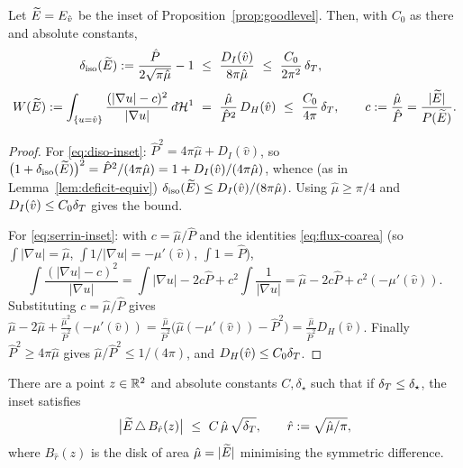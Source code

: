 \begin{proposition}\label{prop:controlled}
Let $\widetilde E=E_{\hat v}$ be the inset of Proposition~\ref{prop:goodlevel}.
Then, with $C_0$ as there and absolute constants,
\begin{align}
   \diso(\Etil):=\frac{\hat P}{2\sqrt{\pi\hat\mu}}-1
   &\ \le\ \frac{D_I(\hat v)}{8\pi\hat\mu}\ \le\ \frac{C_0}{2\pi^2}\,\dT,
   \label{eq:diso-inset}\\[1mm]
   W(\Etil):=\int_{\{u=\hat v\}}\frac{(|\nabla u|-c)^2}{|\nabla u|}\,d\HH^1
   &\ =\ \frac{\hat\mu}{\hat P^{2}}\,D_H(\hat v)\ \le\ \frac{C_0}{4\pi}\,\dT,
   \qquad c:=\frac{\hat\mu}{\hat P}=\frac{|\Etil|}{P(\Etil)}.
   \label{eq:serrin-inset}
\end{align}
\end{proposition}

\begin{proof}
For \eqref{eq:diso-inset}: $\hat P^2=4\pi\hat\mu+D_I(\hat v)$, so
$\bigl(1+\delta_{\mathrm{iso}}(\widetilde E)\bigr)^2=\hat P^2/(4\pi\hat\mu)=1+D_I(\hat
v)/(4\pi\hat\mu)$, whence (as in Lemma~\ref{lem:deficit-equiv})
$\delta_{\mathrm{iso}}(\widetilde E)\le D_I(\hat v)/(8\pi\hat\mu)$. Using
$\hat\mu\ge\pi/4$ and $D_I(\hat v)\le C_0\delta_T$ gives the bound.

For \eqref{eq:serrin-inset}: with $c=\hat\mu/\hat P$ and the identities
\eqref{eq:flux-coarea} (so $\int|\nabla u|=\hat\mu$,
$\int1/|\nabla u|=-\mu'(\hat v)$, $\int 1=\hat P$),
\[
   \int\frac{(|\nabla u|-c)^2}{|\nabla u|}
   =\int|\nabla u|-2c\hat P+c^2\!\int\frac1{|\nabla u|}
   =\hat\mu-2c\hat P+c^2(-\mu'(\hat v)).
\]
Substituting $c=\hat\mu/\hat P$ gives
$\hat\mu-2\hat\mu+\frac{\hat\mu^2}{\hat P^2}(-\mu'(\hat v))
=\frac{\hat\mu}{\hat P^2}\bigl(\hat\mu(-\mu'(\hat v))-\hat P^2\bigr)
=\frac{\hat\mu}{\hat P^2}D_H(\hat v)$.
Finally $\hat P^2\ge4\pi\hat\mu$ gives
$\hat\mu/\hat P^2\le1/(4\pi)$, and $D_H(\hat v)\le C_0\delta_T$.
\end{proof}

\begin{corollary}\label{cor:L1}
There are a point $z\in\mathbb{R}^2$ and absolute constants $C,\delta_\star$ such
that if $\delta_T\le\delta_\star$, the inset satisfies
\begin{equation}\label{eq:L1}
   \bigl|\Etil\,\triangle\,B_{\hat r}(z)\bigr|\ \le\ C\,\hat\mu\,\sqrt{\dT},
   \qquad \hat r:=\sqrt{\hat\mu/\pi},
\end{equation}
where $B_{\hat r}(z)$ is the disk of area $\hat\mu=|\widetilde E|$ minimising the
symmetric difference.
\end{corollary}

